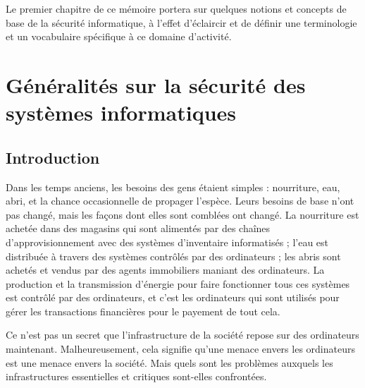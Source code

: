 
Le premier chapitre de ce mémoire portera sur quelques notions et concepts de base de la 
sécurité informatique, à l’effet d’éclaircir et de définir une terminologie et un vocabulaire 
spécifique à ce domaine d’activité. 

\newpage

\section{Généralités sur la sécurité des systèmes informatiques}
    \subsection{Introduction}
    Dans les temps anciens, les besoins des gens étaient simples : nourriture, eau, abri, et la chance occasionnelle
    de propager l'espèce. Leurs besoins de base n'ont pas changé, mais les façons dont elles sont comblées ont changé.
    La nourriture est achetée dans des magasins qui sont alimentés par des chaînes d'approvisionnement avec des
    systèmes d'inventaire informatisés ; l'eau est distribuée à travers des systèmes contrôlés par des ordinateurs ; 
    les abris sont achetés et vendus par des agents immobiliers maniant des ordinateurs.
    La production et la transmission d'énergie pour faire fonctionner tous ces systèmes est contrôlé par des
    ordinateurs, et c'est les ordinateurs qui sont utilisés pour gérer les transactions financières pour le 
    payement de tout cela. \cite{virus} %

    Ce n'est pas un secret que l'infrastructure de la société repose sur des ordinateurs maintenant.
    Malheureusement, cela signifie qu'une menace envers les ordinateurs est une menace envers la société. 
    Mais quels sont les problèmes auxquels les infrastructures essentielles et critiques sont-elles confrontées.%

